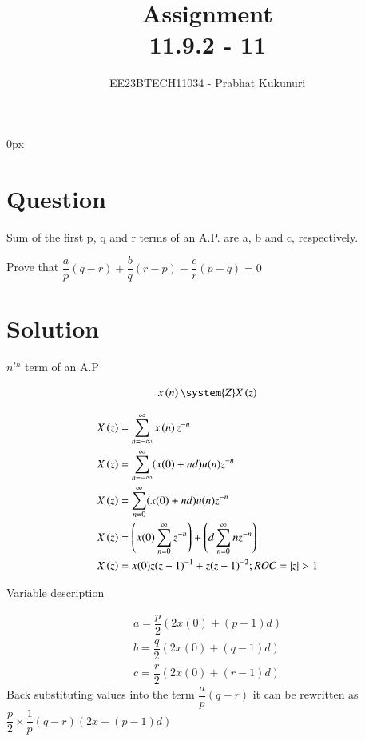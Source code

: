 \documentclass[journal,12pt,twocolumn]{IEEEtran}
\theoremstyle{remark}
\begin{document}
\parindent 0px


\vspace{3cm}

\title{Assignment\\[1ex]11.9.2 - 11}
\author{EE23BTECH11034 - Prabhat Kukunuri$^{}$%
}
\maketitle
\newpage
\bigskip

\renewcommand{\thefigure}{\theenumi}
\renewcommand{\thetable}{\theenumi}
\section*{Question}
Sum of the first p, q and r terms of an A.P. are a, b and c, respectively.

Prove that $\dfrac{a}{p}(q-r)+\dfrac{b}{q}(r-p)+\dfrac{c}{r}(p-q)=0$
\section*{Solution}
\begin{table}[h]
\centering

\caption{$n^{th}$ term of an A.P}
\end{table}
\begin{align}
	x \brak{n} \system{Z} X \brak{z} 
\end{align}

\begin{align}
    X \brak{z} & = \sum_{n=-\infty}^{\infty} x \brak{n}   z^{-n}\\
    X \brak{z} & = \sum_{n=-\infty}^{\infty}(x(0)+nd)u(n)z^{-n}\\
    X \brak{z} & = \sum_{n=0}^{\infty}(x(0)+nd)u(n)z^{-n}\\
    X \brak{z} & = \brak{x(0)\sum_{n=0}^{\infty}z^{-n}}+\brak{d\sum_{n=0}^{\infty}nz^{-n}}\\
    X \brak{z} & = x(0)z(z-1)^{-1} + z(z-1)^{-2} ;ROC = |z|>1
\end{align}
\begin{table}[h]
    \centering
    
    \caption{Variable description}
    \label{11.9.2.11.2}
\end{table}
\begin{align}
    a=\dfrac{p}{2}(2x(0)+(p-1)d)\\
    b=\dfrac{q}{2}(2x(0)+(q-1)d)\\
    c=\dfrac{r}{2}(2x(0)+(r-1)d)
\end{align}
Back substituting values into the term $\dfrac{a}{p}(q-r)$ it can be rewritten as $\dfrac{p}{2} \times \dfrac{1}{p}(q-r)(2x+(p-1)d)$
\end{document}
